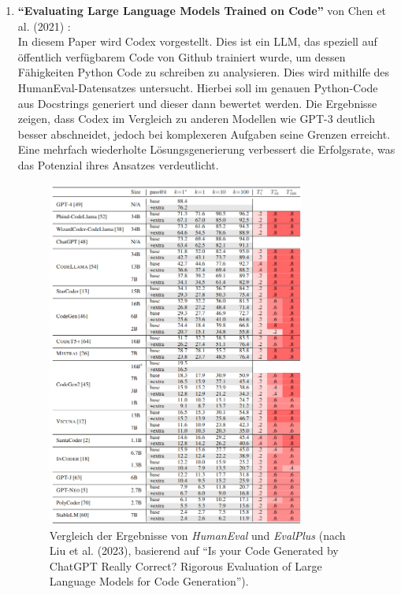 \documentclass[11pt,a4paper]{article}
\begin{document}
\begin{enumerate}
    \item \textbf{``Evaluating Large Language Models Trained on Code''} von Chen et al. (2021) \cite{chen2021evaluatinglargelanguagemodels}:\\
    In diesem Paper wird Codex vorgestellt. Dies ist ein LLM, das speziell auf öffentlich verfügbarem Code von Github trainiert wurde, um dessen Fähigkeiten Python Code zu schreiben zu analysieren. Dies wird mithilfe des HumanEval-Datensatzes untersucht. Hierbei soll im genauen Python-Code aus Docstrings generiert und dieser dann bewertet werden. Die Ergebnisse zeigen, dass Codex im Vergleich zu anderen Modellen wie GPT-3 deutlich besser abschneidet, jedoch bei komplexeren Aufgaben seine Grenzen erreicht. Eine mehrfach wiederholte Lösungsgenerierung verbessert die Erfolgsrate, was das Potenzial ihres Ansatzes verdeutlicht.
    \begin{figure}[H]
        \centering
        \includegraphics[width=0.8\textwidth]{./bilder/results_evalplus.png}
        \caption{Vergleich der Ergebnisse von \emph{HumanEval} und \emph{EvalPlus} (nach Liu et al. (2023), basierend auf ``Is your Code Generated by ChatGPT Really Correct? Rigorous Evaluation of Large Language Models for Code Generation''\cite{NEURIPS2023_43e9d647}).}
        \label{fig:results_evalplus}

\end{figure}
\end{enumerate}
\end{document}
